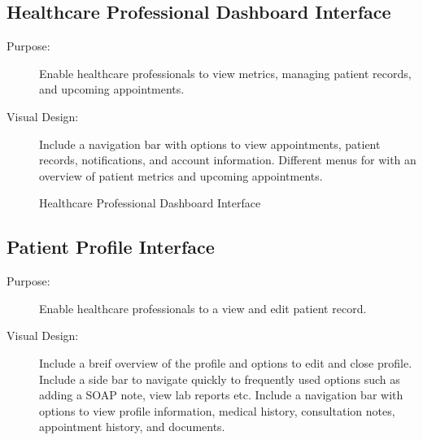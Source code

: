 \documentclass[12pt, titlepage]{article}
\begin{document}
\newpage{}

\subsection{Healthcare Professional Dashboard Interface}
\begin{description}
    \item[Purpose:]Enable healthcare professionals to view metrics, managing patient records, and upcoming appointments.

    \item[Visual Design:]Include a navigation bar with options to view appointments, patient records, notifications, and account information. Different menus for with an overview of patient metrics and upcoming appointments.
    
\end{description}

\begin{figure}[h!]
    \centering
    \caption{Healthcare Professional Dashboard Interface}
    \label{fig:healthcare-interface-1}
\end{figure}

\newpage{}


\subsection{Patient Profile Interface}
\begin{description}
    \item[Purpose:]Enable healthcare professionals to a view and edit patient record.

    \item[Visual Design:]Include a breif overview of the profile and options to edit and close profile. Include a side bar to navigate quickly to frequently used options such as adding a SOAP note, view lab reports etc. Include a navigation bar with options to view profile information, medical history, consultation notes, appointment history, and documents.
    
\end{description}
\end{document}
